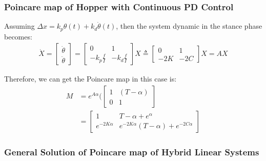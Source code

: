 \subsubsection{Poincare map of Hopper with Continuous PD Control}

Assuming $\Delta x = k_p\theta(t) + k_d\dot\theta(t)$, then the system dynamic in the stance phase becomes:
\begin{align}
\label{eq:EOM_flight3}
\dot X = 
\begin{bmatrix}
\dot \theta  \\
\ddot \theta
\end{bmatrix} = \begin{bmatrix}
0 & 1 \\
-k_p\frac{f}{I} & -k_d\frac{f}{I}
\end{bmatrix}X \triangleq \begin{bmatrix}
0 & 1 \\
-2K & -2C
\end{bmatrix}X = AX
\end{align}

Therefore, we can get the Poincare map in this case is:
\begin{align}
M &=   e^{A\alpha}(\begin{bmatrix}
        1 & (T-\alpha) \\
        0 & 1
        \end{bmatrix}\\
   & =  \begin{bmatrix}
           1 & T-\alpha + e^{\alpha} \\
           e^{-2K\alpha} & e^{-2K\alpha}(T-\alpha) + e^{-2C\alpha}
           \end{bmatrix}
\end{align}
\pagebreak


\subsubsection{General Solution of Poincare map of Hybrid Linear Systems}


